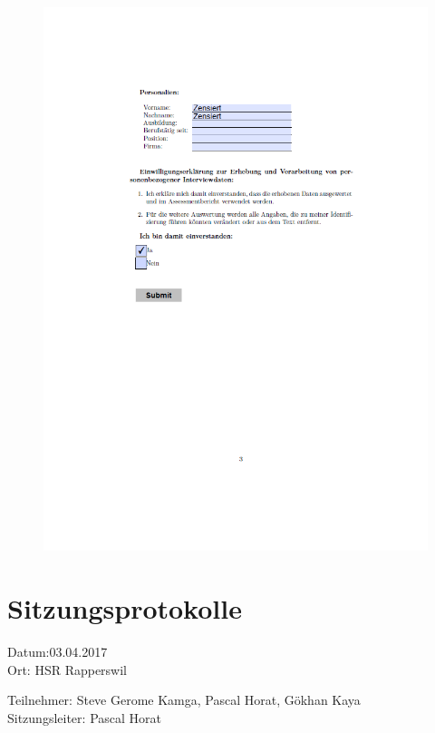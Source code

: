 \begin{figure}[ht]
	\centering
 	\includegraphics[width=1.3\textwidth]{images/Tiwe3.png}
 	\label{fig:fragtiw3}
\end{figure}








\section*{Sitzungsprotokolle}

Datum:03.04.2017\\
Ort: HSR Rapperswil

Teilnehmer: Steve Gerome Kamga, Pascal Horat, Gökhan Kaya\\
Sitzungsleiter: Pascal Horat

